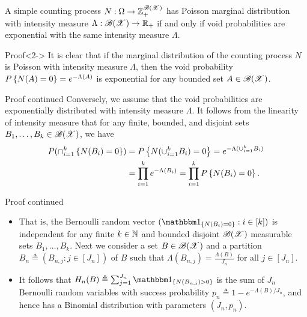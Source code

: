\documentclass[12pt,aspectratio=169]{beamer}
\begin{document}
\begin{frame}
\begin{cor}
\label{cor:ExpPoisson}
A simple counting process $N: \Omega \to \mathbb{Z}_+^{\mathscr{B}(\mathscr{X})}$ has Poisson marginal distribution with intensity measure $\Lambda:\mathscr{B}(\mathscr{X})\to\mathbb{R}_+$ if and only if void probabilities are exponential with the same intensity measure $\Lambda$. 
\end{cor}
\begin{block}{Proof}<2->
It is clear that if the marginal distribution of the counting process $N$ is Poisson with intensity measure $\Lambda$, then the void probability $P\left\{N(A) = 0\right\} = e^{-\Lambda(A)}$ is exponential for any bounded set $A \in \mathscr{B}(\mathscr{X})$. 
\end{block}
\end{frame}


\begin{frame}
\begin{block}{Proof continued}
Conversely, we assume that the void probabilities are exponentially distributed with intensity measure $\Lambda$. 
It follows from the linearity of intensity measure that for any finite, bounded, and disjoint sets $B_1, \dots, B_k \in \mathscr{B}(\mathscr{X})$, we have 
\begin{align*}
P(\cap_{i=1}^k\left\{N(B_i)=0\right\}) 
&= P\left\{N(\cup_{i=1}^kB_i) = 0\right\}
= e^{-\Lambda(\cup_{i=1}^kB_i)} \\
&= \prod_{i=1}^ke^{-\Lambda(B_i)}
= \prod_{i=1}^kP\left\{N(B_i) = 0\right\}.
\end{align*}
\end{block}
\end{frame}


\begin{frame}
\begin{block}{Proof continued}
\begin{itemize}
\item That is, the Bernoulli random vector $(\SetIn{N(B_i) = 0}: i \in [k])$ is independent for any finite $k \in \mathbb{N}$ and bounded disjoint $\mathscr{B}(\mathscr{X})$ measurable sets $B_1, \dots, B_k$. 
Next we consider a set $B \in \mathscr{B}(\mathscr{X})$ and a partition $B_n \triangleq (B_{n,j}: j \in [J_n])$ of $B$ such that $\Lambda(B_{n,j}) = \frac{\Lambda(B)}{J_n}$ for all $j \in [J_n]$. 
\item <2-> It follows that $H_n(B) \triangleq \sum_{j=1}^{J_n}\SetIn{N(B_{n,j})> 0}$ is the sum of $J_n$ \iid Bernoulli random variables with success probability $p_n \triangleq 1-e^{-\Lambda(B)/J_n}$, 
and hence has a Binomial distribution with parameters $(J_n, p_n)$.  
\end{itemize}
\end{block}
\end{frame}
\end{document}
